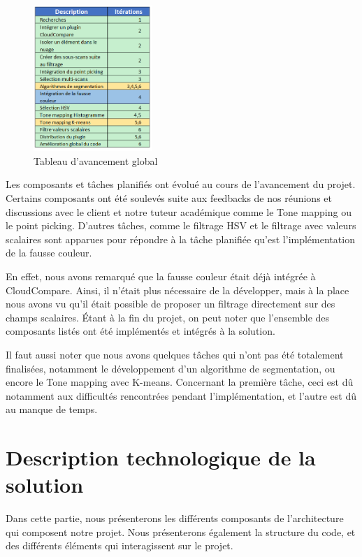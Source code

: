 \documentclass[12pt,titlepage,french]{article}
\begin{document}
\begin{figure}[H]
\center \includegraphics[width=0.4\textwidth]{./img/avancement.png}
  \caption{\label{} Tableau d'avancement global}
\end{figure}

Les composants et tâches planifiés ont évolué au cours de l'avancement du projet.
Certains composants ont été soulevés suite aux feedbacks de nos réunions et discussions avec le client et notre tuteur académique comme le Tone mapping ou le point picking.
D'autres tâches, comme le filtrage HSV et le filtrage avec valeurs scalaires sont apparues pour répondre à la tâche planifiée qu'est l'implémentation de la fausse couleur.\newline

En effet, nous avons remarqué que la fausse couleur était déjà intégrée à CloudCompare.
Ainsi, il n'était plus nécessaire de la développer, mais à la place nous avons vu qu'il était possible de proposer un filtrage directement sur des champs scalaires.
Étant à la fin du projet, on peut noter que l'ensemble des composants listés ont été implémentés et intégrés à la solution. \newline

Il faut aussi noter que nous avons quelques tâches qui n'ont pas été totalement finalisées, notamment le développement d'un algorithme de segmentation, ou encore le Tone mapping avec K-means. Concernant la première tâche, ceci est dû notamment aux difficultés rencontrées pendant l'implémentation, et l'autre est dû au manque de temps.

\section{Description technologique de la solution}

Dans cette partie, nous présenterons les différents composants de l'architecture qui composent notre projet. Nous présenterons également la structure du code, et des différents éléments qui interagissent sur le projet.
\end{document}
